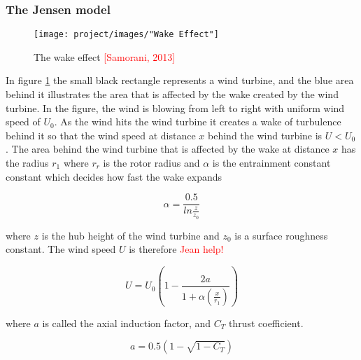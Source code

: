 \documentclass{article}
\begin{document}
\subsubsection{The Jensen model}


\begin{figure}[h!]
\begin{center}
\texttt{[image: project/images/"Wake Effect"]}
\caption{The wake effect \textcolor{red}{[Samorani, 2013]}}
\label{Wake effect}
\end{center}
\end{figure}


In figure \ref{Wake effect} the small black rectangle represents a wind turbine, and the blue area behind it illustrates the area that is affected by the wake created by the wind turbine. In the figure, the wind is blowing from left to right with uniform wind speed of $U_0$. As the wind hits the wind turbine it creates a wake of turbulence behind it so that the wind speed at distance $x$ behind the wind turbine is $U < U_0$. The area behind the wind turbine that is affected by the wake at distance $x$ has the radius $r_1$ where $r_r$ is the rotor radius and $\alpha$ is the entrainment constant constant which decides how fast the wake expands


\begin{equation}
\alpha = \frac{0.5}{ln\frac{z}{z_0}}
\label{Alpha}
\end{equation}

where $z$ is the hub height of the wind turbine and $z_0$ is a surface roughness constant. The wind speed $U$ is therefore \textcolor{red}{Jean help!}


\begin{equation}
U = U_0\left(1 - \frac{2a}{1 + \alpha\left(\frac{x}{r_1}\right)}\right)
\label{Alpha}
\end{equation}


where $a$ is called the axial induction factor, and $C_T$ thrust coefficient.


\begin{equation}
a = 0.5 \left(1 - \sqrt{1 - C_T}\right)
\end{equation}
\end{document}
